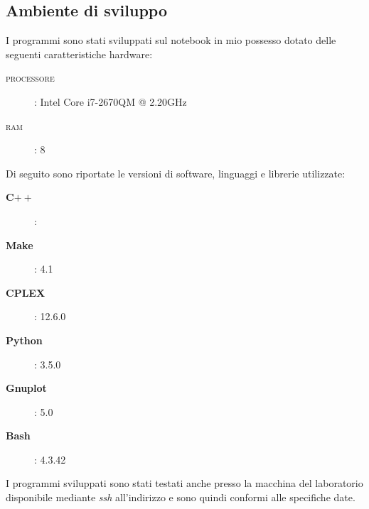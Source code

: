 \subsection{Ambiente di sviluppo}
\label{sec:ambiente}
I programmi sono stati sviluppati sul notebook in mio possesso dotato delle seguenti caratteristiche hardware:
\begin{description}
\item[\textsc{processore}]: Intel Core i7-2670QM @ 2.20GHz
\item[\textsc{ram}]: 8
\end{description}

Di seguito sono riportate le versioni di software, linguaggi e librerie utilizzate:
\begin{description}
\item[\textbf{C$++$}]: 
\item[\textbf{Make}]: 4.1
\item[\textbf{CPLEX}]: 12.6.0
\item[\textbf{Python}]: 3.5.0
\item[\textbf{Gnuplot}]: 5.0
\item[\textbf{Bash}]: 4.3.42
\end{description}

I programmi sviluppati sono stati testati anche presso la macchina del laboratorio disponibile mediante \emph{ssh} all'indirizzo  e sono quindi conformi alle specifiche date.